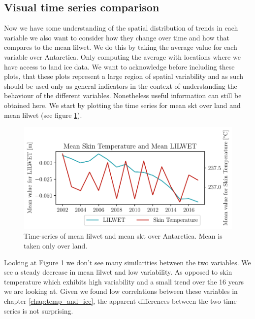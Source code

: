 \documentclass[../main.tex]{subfiles}
\begin{document}
\FloatBarrier
\subsection{Visual time series comparison}
Now we have some understanding of the spatial distribution of trends in each variable we also want to consider how they change over time and how that compares to the mean \gls{lilwet}. We do this by taking the average value for each variable over Antarctica. Only computing the average with locations where we have access to land ice data. We want to acknowledge before including these plots, that these plots represent a large region of spatial variability and as such should be used only as general indicators in the context of understanding the behaviour of the different variables. Nonetheless useful information can still be obtained here. We start by plotting the time series for mean \gls{skt} over land and mean \gls{lilwet} (see figure \ref{fig:timeseries_skt}).

\begin{figure}[hbt!]
    \centering
    \includegraphics{images/2021w5/chapter7/hres/tiemseries_skt_LIC}
    \caption{Time-series of mean \gls{lilwet} and mean \gls{skt} over Antarctica. Mean is taken only over land.}
    \label{fig:timeseries_skt}
\end{figure}

Looking at Figure \ref{fig:timeseries_skt} we don't see many similarities between the two variables. We see a steady decrease in mean \gls{lilwet} and low variability. As opposed to skin temperature which exhibits high variability and a small trend  over the 16 years we are looking at. Given we found low correlations between these variables in chapter \ref{chap:temp_and_ice}, the apparent differences between the two time-series is not surprising. 
\end{document}
